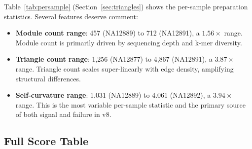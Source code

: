 \documentclass{../yalumba}
\begin{document}
Table~\ref{tab:persample} (Section~\ref{sec:triangles}) shows the per-sample
preparation statistics.  Several features deserve comment:

\begin{itemize}
  \item \textbf{Module count range}: 457 (NA12889) to 712 (NA12891), a
    $1.56\times$ range.  Module count is primarily driven by sequencing
    depth and k-mer diversity.
  \item \textbf{Triangle count range}: 1{,}256 (NA12877) to 4{,}867
    (NA12891), a $3.87\times$ range.  Triangle count scales
    super-linearly with edge density, amplifying structural differences.
  \item \textbf{Self-curvature range}: 1.031 (NA12889) to 4.061 (NA12892),
    a $3.94\times$ range.  This is the most variable per-sample statistic
    and the primary source of both signal and failure in v8.
\end{itemize}

\subsection{Full Score Table}
\end{document}
